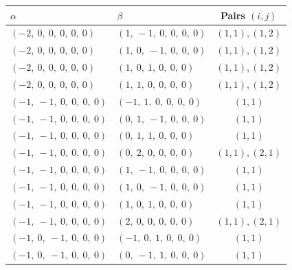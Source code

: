 \documentclass[11pt]{article}
\theoremstyle{definition}
\begin{document}
\begin{center}
\begin{tabular}{|l|l|c|}
    \hline
    $\alpha$ & $\beta$ & Pairs $(i,j)$ \\
    \hline
    $\left( -2, \  0, \  0, \  0, \  0, \  0\right)$ & $\left( 1, \  -1, \  0, \  0, \  0, \  0\right)$ & $(1,1), (1,2)$ \\
    \hline
    $\left( -2, \  0, \  0, \  0, \  0, \  0\right)$ & $\left( 1, \  0, \  -1, \  0, \  0, \  0\right)$ & $(1,1), (1,2)$ \\
    \hline
    $\left( -2, \  0, \  0, \  0, \  0, \  0\right)$ & $\left( 1, \  0, \  1, \  0, \  0, \  0\right)$ & $(1,1), (1,2)$ \\
    \hline
    $\left( -2, \  0, \  0, \  0, \  0, \  0\right)$ & $\left( 1, \  1, \  0, \  0, \  0, \  0\right)$ & $(1,1), (1,2)$ \\
    \hline
    $\left( -1, \  -1, \  0, \  0, \  0, \  0\right)$ & $\left( -1, \  1, \  0, \  0, \  0, \  0\right)$ & $(1,1)$ \\
    \hline
    $\left( -1, \  -1, \  0, \  0, \  0, \  0\right)$ & $\left( 0, \  1, \  -1, \  0, \  0, \  0\right)$ & $(1,1)$ \\
    \hline
    $\left( -1, \  -1, \  0, \  0, \  0, \  0\right)$ & $\left( 0, \  1, \  1, \  0, \  0, \  0\right)$ & $(1,1)$ \\
    \hline
    $\left( -1, \  -1, \  0, \  0, \  0, \  0\right)$ & $\left( 0, \  2, \  0, \  0, \  0, \  0\right)$ & $(1,1), (2,1)$ \\
    \hline
    $\left( -1, \  -1, \  0, \  0, \  0, \  0\right)$ & $\left( 1, \  -1, \  0, \  0, \  0, \  0\right)$ & $(1,1)$ \\
    \hline
    $\left( -1, \  -1, \  0, \  0, \  0, \  0\right)$ & $\left( 1, \  0, \  -1, \  0, \  0, \  0\right)$ & $(1,1)$ \\
    \hline
    $\left( -1, \  -1, \  0, \  0, \  0, \  0\right)$ & $\left( 1, \  0, \  1, \  0, \  0, \  0\right)$ & $(1,1)$ \\
    \hline
    $\left( -1, \  -1, \  0, \  0, \  0, \  0\right)$ & $\left( 2, \  0, \  0, \  0, \  0, \  0\right)$ & $(1,1), (2,1)$ \\
    \hline
    $\left( -1, \  0, \  -1, \  0, \  0, \  0\right)$ & $\left( -1, \  0, \  1, \  0, \  0, \  0\right)$ & $(1,1)$ \\
    \hline
    $\left( -1, \  0, \  -1, \  0, \  0, \  0\right)$ & $\left( 0, \  -1, \  1, \  0, \  0, \  0\right)$ & $(1,1)$ \\

\end{tabular}
\end{center}
\end{document}
